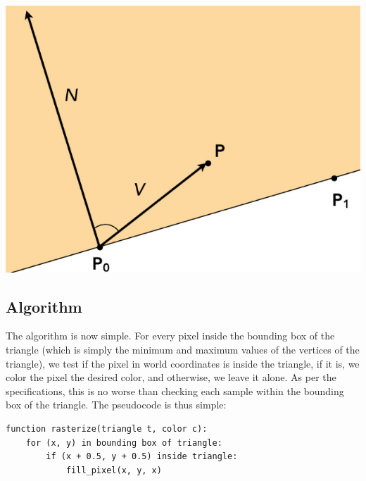 \documentclass{article}
\begin{document}
\begin{center}
 \includegraphics[]{Task 1/dotprod.png}   
\end{center}
\subsection{Algorithm}
The algorithm is now simple. For every pixel inside the bounding box of the triangle (which is simply the minimum and maximum values of the vertices of the triangle), we test if the pixel in world coordinates is inside the triangle, if it is, we color the pixel the desired color, and otherwise, we leave it alone. As per the specifications, this is no worse than checking each sample within the bounding box of the triangle. The pseudocode is thus simple:
\begin{verbatim}
function rasterize(triangle t, color c):
    for (x, y) in bounding box of triangle:
        if (x + 0.5, y + 0.5) inside triangle:
            fill_pixel(x, y, x)
\end{verbatim}
\newpage
\end{document}
